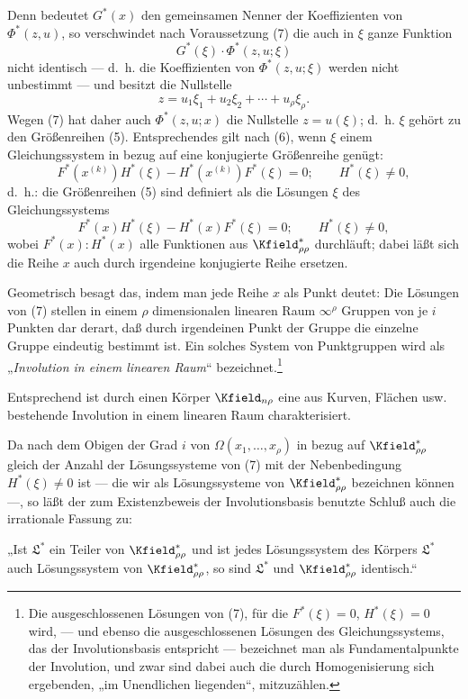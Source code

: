 \documentclass[11pt]{article}
\begin{document}
Denn bedeutet $G^*(x)$ den gemeinsamen Nenner der Koeffizienten von $\Phi^*(z,u)$, so verschwindet nach Voraussetzung (7) die auch in $\xi$ ganze Funktion
\[
  G^*(\xi)\cdot\Phi^*(z,u;\xi)
\]
nicht identisch --- d.~h. die Koeffizienten von $\Phi^*(z,u;\xi)$ werden nicht unbestimmt --- und besitzt die Nullstelle
\[
  z=u_1\xi_1+u_2\xi_2+\cdots+u_\rho\xi_\rho.
\]
Wegen (7) hat daher auch $\Phi^*(z,u;x)$ die Nullstelle $z=u(\xi)$; d.~h. $\xi$ gehört zu den Größenreihen (5). Entsprechendes gilt nach (6), wenn $\xi$ einem Gleichungssystem in bezug auf eine konjugierte Größenreihe genügt:
\[
  F^*(x^{(k)})H^*(\xi)-H^*(x^{(k)})F^*(\xi)=0;
  \qquad H^*(\xi)\ne0,
\]
d.~h.: die Größenreihen (5) sind definiert als die Lösungen $\xi$ des Gleichungssystems
\[
  F^*(x)H^*(\xi)-H^*(x)F^*(\xi)=0;
  \qquad H^*(\xi)\ne0,
\]
wobei $F^*(x):H^*(x)$ alle Funktionen aus $\Kfield^*_{\rho\rho}$ durchläuft; dabei läßt sich die Reihe $x$ auch durch irgendeine konjugierte Reihe ersetzen.

Geometrisch besagt das, indem man jede Reihe $x$ als Punkt deutet: Die Lösungen von (7) stellen in einem $\rho$ dimensionalen linearen Raum $\infty^\rho$ Gruppen von je $i$ Punkten dar derart, daß durch irgendeinen Punkt der Gruppe die einzelne Gruppe eindeutig bestimmt ist. Ein solches System von Punktgruppen wird als „\emph{Involution in einem linearen Raum}“ bezeichnet.\footnote{Die ausgeschlossenen Lösungen von (7), für die $F^*(\xi)=0$, $H^*(\xi)=0$ wird, --- und ebenso die ausgeschlossenen Lösungen des Gleichungssystems, das der Involutionsbasis entspricht --- bezeichnet man als Fundamentalpunkte der Involution, und zwar sind dabei auch die durch Homogenisierung sich ergebenden, „im Unendlichen liegenden“, mitzuzählen.}

Entsprechend ist durch einen Körper $\Kfield_{n\rho}$ eine aus Kurven, Flächen usw. bestehende Involution in einem linearen Raum charakterisiert.

Da nach dem Obigen der Grad $i$ von $\Omega(x_1,
\ldots,x_\rho)$ in bezug auf $\Kfield^*_{\rho\rho}$ gleich der Anzahl der Lösungssysteme von (7) mit der Nebenbedingung $H^*(\xi)\ne0$ ist --- die wir als Lösungssysteme von $\Kfield^*_{\rho\rho}$ bezeichnen können ---, so läßt der zum Existenzbeweis der Involutionsbasis benutzte Schluß auch die irrationale Fassung zu:

„Ist $\mathfrak{L}^*$ ein Teiler von $\Kfield^*_{\rho\rho}$ und ist jedes Lösungssystem des Körpers $\mathfrak{L}^*$ auch Lösungssystem von $\Kfield^*_{\rho\rho}$, so sind $\mathfrak{L}^*$ und $\Kfield^*_{\rho\rho}$ identisch.“
\end{document}
